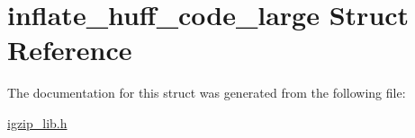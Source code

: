 \hypertarget{structinflate__huff__code__large}{\section{inflate\-\_\-huff\-\_\-code\-\_\-large Struct Reference}
\label{structinflate__huff__code__large}
}


The documentation for this struct was generated from the following file\-:\begin{DoxyCompactItemize}
\item 
\hyperlink{igzip__lib_8h}{igzip\-\_\-lib.\-h}\end{DoxyCompactItemize}
